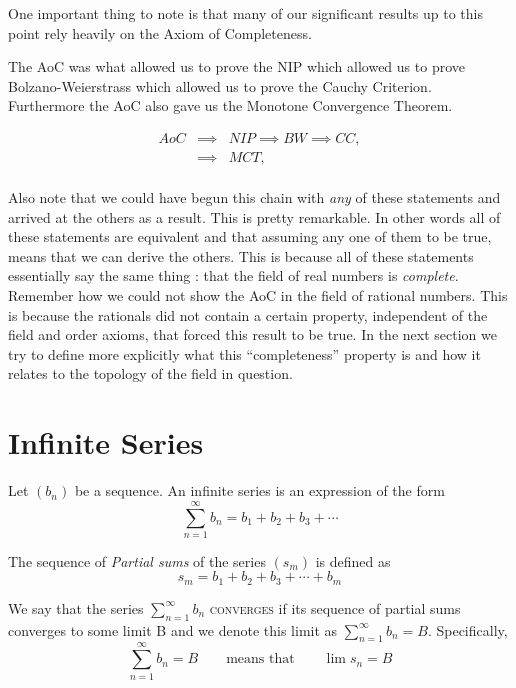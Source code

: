One important thing to note is that many of our significant results up to this point rely heavily on the Axiom of Completeness.

The AoC was what allowed us to prove the NIP which allowed us to prove Bolzano-Weierstrass which allowed us to prove the Cauchy Criterion.  Furthermore the AoC also gave us the Monotone Convergence Theorem.

$$
\begin{array}{rcl}
AoC &\implies & NIP \implies BW \implies CC ,\\
&\implies & MCT,\\
\end{array}
$$

Also note that we could have begun this chain with \emph{any} of these statements and arrived at the others as a result.  This is pretty remarkable.  In other words all of these statements are equivalent and that assuming any one of them to be true, means that we can derive the others.   This is because all of these statements essentially say the same thing : that the field of real numbers is \emph{complete}.   Remember how we could not show the AoC in the field of rational numbers.  This is because the rationals did not contain a certain property, independent of the field and order axioms, that forced this result to be true.  In the next section we try to define more explicitly what this ``completeness'' property is and how it relates to the topology of the field in question.


\section{Infinite Series}


  Let $(b_n)$ be a sequence.  An infinite series is an expression of the form
		\[\sum_{n=1}^{\infty} b_n = b_1 + b_2 + b_3 + \cdots \]
		
		The sequence of \emph{Partial sums} of the series $(s_m)$ is defined as 
			\[s_m = b_1 + b_2 + b_3 + \cdots + b_m \]
			
		We say that the series $\sum_{n=1}^{\infty} b_n$ \textsc{converges} if its sequence of partial sums converges to some limit B and we denote this limit as $\sum_{n=1}^{\infty} b_n  = B$.
		Specifically,
		\[\sum_{n=1}^{\infty} b_n = B \qquad \text{means that} \qquad \lim s_n = B\]
		
